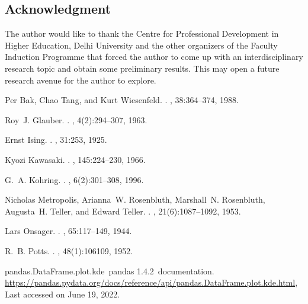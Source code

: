 \documentclass[a4paper,12pt]{article}
\begin{document}
\subsection*{Acknowledgment}
The author would like to thank the Centre for Professional Development in Higher Education,
Delhi University and the other organizers of the Faculty Induction Programme that forced
the author to come up with an interdisciplinary research topic and obtain some preliminary results.
This may open a future research avenue for the author to explore.


\clearpage\pagebreak
\begin{thebibliography}{10}

Per Bak, Chao Tang, and Kurt Wiesenfeld.
.
, 38:364--374, 1988.

Roy~J. Glauber.
.
, 4(2):294--307, 1963.

Ernst Ising.
.
, 31:253, 1925.

Kyozi Kawasaki.
.
, 145:224--230, 1966.

G.~A. Kohring.
.
, 6(2):301--308, 1996.

Nicholas Metropolis, Arianna~W. Rosenbluth, Marshall~N. Rosenbluth, Augusta~H.
  Teller, and Edward Teller.
.
, 21(6):1087--1092, 1953.

Lars Onsager.
.
, 65:117--149, 1944.

R.~B. Potts.
.
, 48(1):106109, 1952.

\raggedright pandas.DataFrame.plot.kde~pandas 1.4.2~documentation.
\newblock
  \href{https://pandas.pydata.org/docs/reference/api/pandas.DataFrame.plot.kde.html}{https://pandas.pydata.org/docs/reference/api/pandas.DataFrame.plot.kde.html},
  Last accessed on June 19, 2022.


\end{thebibliography}
\end{document}
